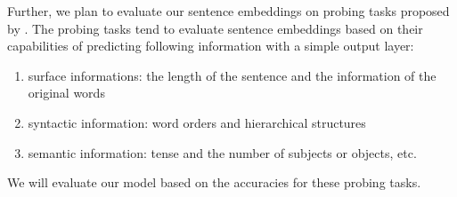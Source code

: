 \documentclass[11pt,a4paper]{article}
\begin{document}
Further, we plan to evaluate our sentence embeddings on probing tasks proposed by \citet{conneau2018you}. The probing tasks tend to evaluate sentence embeddings based on their capabilities of predicting following information with a simple output layer:
\begin{enumerate}
    \item surface informations: the length of the sentence and the information of the original words
    \item syntactic information: word orders and hierarchical structures
    \item semantic information: tense and the number of subjects or objects, etc.
\end{enumerate}
We will evaluate our model based on the accuracies for these probing tasks.



\end{document}
